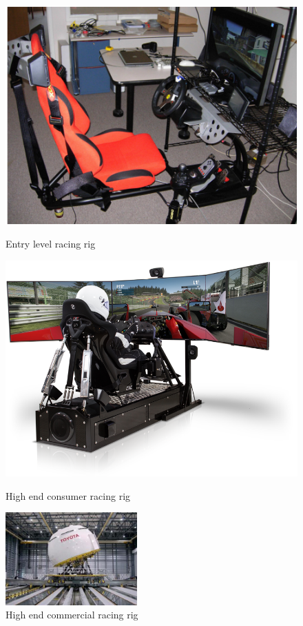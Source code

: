 \begin{figure}
	\centering
	\begin{minipage}{0.45\textwidth}
		\centering
		\includegraphics[width=\textwidth]{images/rig1}
		\caption{Entry level racing rig}
		\label{fig:Entrylevelracingrig}
	\end{minipage}\hfill
	\begin{minipage}{0.45\textwidth}
		\centering
		\includegraphics[width=\textwidth]{images/rig2}
		\caption{High end consumer racing rig}
		\label{fig:Highendconsumerracingrig}
	\end{minipage}
		\centering
		\includegraphics[width=0.45\textwidth]{images/rig3.png}
		\caption{High end commercial racing rig}
		\label{fig:commercialracingrig}
\end{figure}


